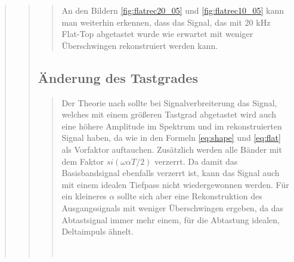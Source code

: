 \begin{quote}
\begin{quote}
\begin{quote}
            An den Bildern \ref{fig:flatrec20_05} und \ref{fig:flatrec10_05} kann man weiterhin erkennen, dass das
            Signal, das mit 20 kHz Flat-Top abgetastet wurde wie erwartet mit weniger Überschwingen rekonstruiert werden kann.
            
          
            
          
        \end{quote}
        
        
        \subsection{Änderung des Tastgrades}
        \begin{quote}
             
             Der Theorie nach sollte bei Signalverbreiterung das Signal, welches mit einem größeren Tastgrad abgetastet
             wird auch eine höhere Amplitude im Spektrum und im rekonstruierten Signal haben, da wie in den Formeln \ref{eq:shape} und
             \ref{eq:flat} als Vorfaktor auftauchen. Zusätzlich werden alle Bänder mit dem Faktor $si(\omega
             \alpha T/2)$ verzerrt. Da damit das Basisbandsignal ebenfalls verzerrt ist, kann das Signal auch mit einem idealen
             Tiefpass nicht wiedergewonnen werden. Für ein kleineres $\alpha$ sollte sich aber eine
             Rekonstruktion des Ausgangssignals mit weniger Überschwingen ergeben, da das Abtastsignal immer mehr einem,
             für die Abtastung idealen, Deltaimpuls ähnelt.\\
             \\
             
              \begin{center}
            \begin{tabular}{ll}
            

\end{tabular}
\end{center}
\end{quote}
\end{quote}
\end{quote}
